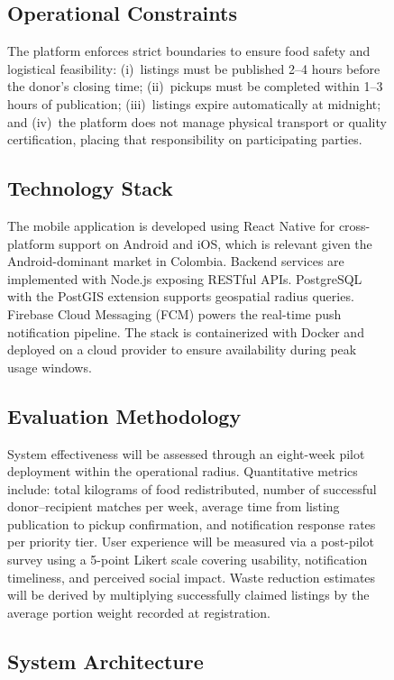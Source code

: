 \documentclass[conference]{IEEEtran}
\begin{document}
\begin{figure}[htbp]
\subsection{Operational Constraints}

The platform enforces strict boundaries to ensure food safety and logistical feasibility: (i)~listings must be published 2--4 hours before the donor's closing time; (ii)~pickups must be completed within 1--3 hours of publication; (iii)~listings expire automatically at midnight; and (iv)~the platform does not manage physical transport or quality certification, placing that responsibility on participating parties.

\subsection{Technology Stack}

The mobile application is developed using React Native for cross-platform support on Android and iOS, which is relevant given the Android-dominant market in Colombia. Backend services are implemented with Node.js exposing RESTful APIs. PostgreSQL with the PostGIS extension supports geospatial radius queries. Firebase Cloud Messaging (FCM) powers the real-time push notification pipeline. The stack is containerized with Docker and deployed on a cloud provider to ensure availability during peak usage windows.

\subsection{Evaluation Methodology}

System effectiveness will be assessed through an eight-week pilot deployment within the operational radius. Quantitative metrics include: total kilograms of food redistributed, number of successful donor--recipient matches per week, average time from listing publication to pickup confirmation, and notification response rates per priority tier. User experience will be measured via a post-pilot survey using a 5-point Likert scale covering usability, notification timeliness, and perceived social impact. Waste reduction estimates will be derived by multiplying successfully claimed listings by the average portion weight recorded at registration.

\subsection{System Architecture}


\end{figure}
\end{document}
